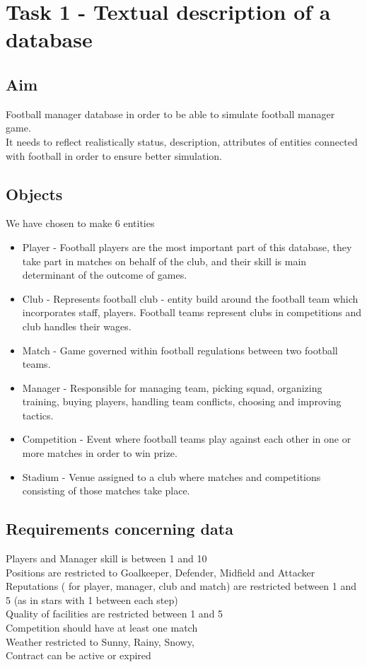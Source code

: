 \documentclass{report}
\begin{document}
\chapter{Task 1 - Textual description of a database}
\section{Aim}

Football manager database in order to be able to simulate football manager game. \\ 
It needs to reflect realistically status, description, attributes of entities connected with football in order to ensure better simulation. \\ 


\section{Objects}  \label{Objects Section}
We have chosen to make 6 entities \\ 
\begin{itemize}
    \item Player - Football players are the most important part of this database, they take part in matches on behalf of the club, and their skill is main determinant of the outcome of games.
    \item Club - Represents football club - entity build around the football team which incorporates staff, players. Football teams represent clubs in competitions and club handles their wages. 
    \item Match - Game governed within football regulations between two football teams.
    \item Manager - Responsible for managing team, picking squad, organizing training, buying players, handling team conflicts, choosing and improving tactics. 
    \item Competition - Event where football teams play against each other in one or more matches in order to win prize. 
    \item Stadium - Venue assigned to a club where matches and competitions consisting of those matches take place.
\end{itemize} 

\section{Requirements concerning data}
Players and Manager skill is between 1 and 10 \\ 
Positions are restricted to Goalkeeper, Defender, Midfield and Attacker \\ 
Reputations ( for player, manager, club and match) are restricted between 1 and 5 (as in stars with 1 between each step) \\
Quality of facilities are restricted between 1 and 5 \\ 
Competition should have at least one match \\ 
Weather restricted to Sunny, Rainy, Snowy, \\ 
Contract can be active or expired \\
\end{document}
